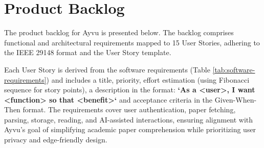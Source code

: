 \documentclass[12pt]{article}
\begin{document}
\section{Product Backlog}

The product backlog for Ayvu is presented below. The backlog comprises functional and architectural requirements mapped to 15 User Stories, adhering to the IEEE 29148 format and the User Story template.

Each User Story is derived from the software requirements (Table \ref{tab:software-requirements}) and includes a title, priority, effort estimation (using Fibonacci sequence for story points), a description in the format:
\textbf{`As a <user>, I want <function> so that <benefit>`}
and acceptance criteria in the Given-When-Then format. The requirements cover user authentication, paper fetching, parsing, storage, reading, and AI-assisted interactions, ensuring alignment with Ayvu's goal of simplifying academic paper comprehension while prioritizing user privacy and edge-friendly design.
\end{document}
